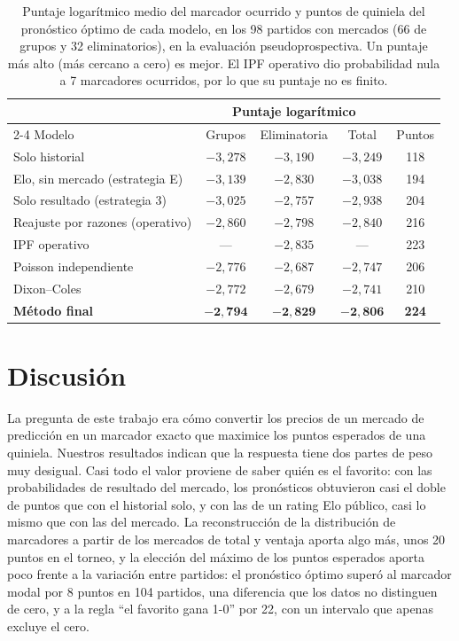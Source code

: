 \documentclass[12pt]{article}
\theoremstyle{plain}
\theoremstyle{remark}
\begin{document}
\begin{table}[!htb]
\centering
\caption{Puntaje logarítmico medio del marcador ocurrido y puntos de
quiniela del pronóstico óptimo de cada modelo, en los 98 partidos con
mercados (66 de grupos y 32 eliminatorios), en la evaluación
pseudoprospectiva. Un puntaje más alto (más cercano a cero) es mejor.
El IPF operativo dio probabilidad nula a 7 marcadores ocurridos, por
lo que su puntaje no es finito.}
\label{tab:modelos}
\small
\begin{tabular}{lcccc}
\toprule
& \multicolumn{3}{c}{Puntaje logarítmico} & \\
\cmidrule(lr){2-4}
Modelo & Grupos & Eliminatoria & Total & Puntos \\
\midrule
Solo historial                    & $-3{,}278$ & $-3{,}190$ & $-3{,}249$ & 118 \\
Elo, sin mercado (estrategia E)   & $-3{,}139$ & $-2{,}830$ & $-3{,}038$ & 194 \\
Solo resultado (estrategia 3)     & $-3{,}025$ & $-2{,}757$ & $-2{,}938$ & 204 \\
Reajuste por razones (operativo)  & $-2{,}860$ & $-2{,}798$ & $-2{,}840$ & 216 \\
IPF operativo                     & ---        & $-2{,}835$ & ---        & 223 \\
Poisson independiente             & $-2{,}776$ & $-2{,}687$ & $-2{,}747$ & 206 \\
Dixon--Coles                      & $-2{,}772$ & $-2{,}679$ & $-2{,}741$ & 210 \\
\textbf{Método final}             & $\mathbf{-2{,}794}$ & $\mathbf{-2{,}829}$ & $\mathbf{-2{,}806}$ & \textbf{224} \\
\bottomrule
\end{tabular}
\end{table}


\FloatBarrier

\section{Discusión}
\label{sec:discusion}

La pregunta de este trabajo era cómo convertir los precios de un
mercado de predicción en un marcador exacto que maximice los puntos
esperados de una quiniela.
Nuestros resultados indican que la respuesta tiene dos partes de peso
muy desigual.
Casi todo el valor proviene de saber quién es el favorito: con las
probabilidades de resultado del mercado, los pronósticos obtuvieron
casi el doble de puntos que con el historial solo, y con las de un
rating Elo público, casi lo mismo que con las del mercado.
La reconstrucción de la distribución de marcadores a partir de los
mercados de total y ventaja aporta algo más, unos 20 puntos en el
torneo, y la elección del máximo de los puntos esperados aporta poco
frente a la variación entre partidos: el pronóstico óptimo superó al
marcador modal por 8 puntos en 104 partidos, una diferencia que los
datos no distinguen de cero, y a la regla ``el favorito gana 1-0''
por 22, con un intervalo que apenas excluye el cero.
\end{document}

